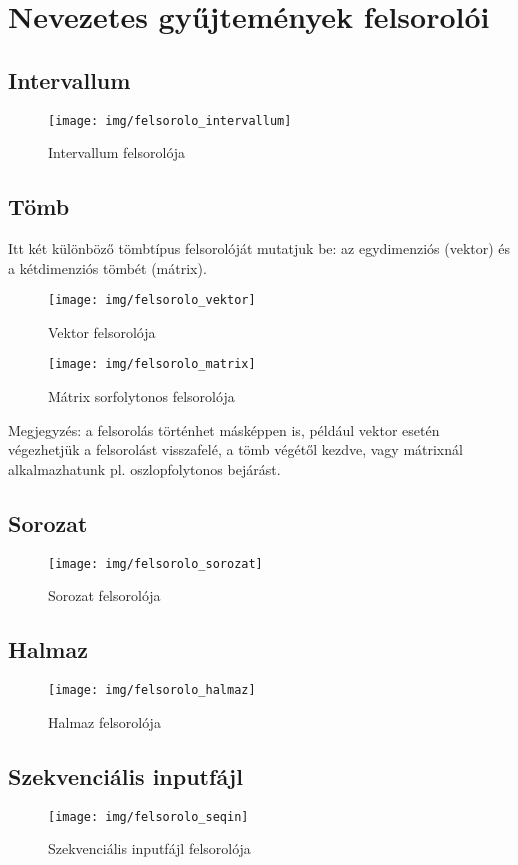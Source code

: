 \documentclass[margin=0px]{article}
\begin{document}


\section{Nevezetes gyűjtemények felsorolói}

\subsection{Intervallum}
\begin{figure}[H]
    \centering
    \texttt{[image: img/felsorolo\_intervallum]}
    \caption{Intervallum felsorolója}
    \label{fig:felsorolo_intervallum}
\end{figure}

\subsection{Tömb}
Itt két különböző tömbtípus felsorolóját mutatjuk be: az egydimenziós (vektor) és a kétdimenziós tömbét (mátrix).

\begin{figure}[H]
    \centering
    \texttt{[image: img/felsorolo\_vektor]}
    \caption{Vektor felsorolója}
    \label{fig:felsorolo_vektor}
\end{figure}

\begin{figure}[H]
    \centering
    \texttt{[image: img/felsorolo\_matrix]}
    \caption{Mátrix sorfolytonos felsorolója}
    \label{fig:felsorolo_matrix}
\end{figure}

Megjegyzés: a felsorolás történhet másképpen is, például vektor esetén végezhetjük a felsorolást visszafelé, a tömb végétől kezdve, vagy mátrixnál alkalmazhatunk pl. oszlopfolytonos bejárást.

\subsection{Sorozat}
\begin{figure}[H]
    \centering
    \texttt{[image: img/felsorolo\_sorozat]}
    \caption{Sorozat felsorolója}
    \label{fig:felsorolo_sorozat}
\end{figure}

\subsection{Halmaz}
\begin{figure}[H]
    \centering
    \texttt{[image: img/felsorolo\_halmaz]}
    \caption{Halmaz felsorolója}
    \label{fig:felsorolo_halmaz}
\end{figure}

\subsection{Szekvenciális inputfájl}
\begin{figure}[H]
    \centering
    \texttt{[image: img/felsorolo\_seqin]}
    \caption{Szekvenciális inputfájl felsorolója}
    \label{fig:felsorolo_seqin}
\end{figure}
\end{document}
